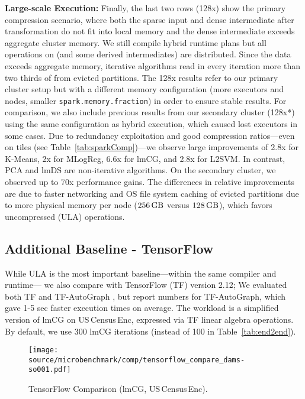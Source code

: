 \textbf{Large-scale Execution:}
Finally, the last two rows (128x) show the primary compression scenario, where both
the sparse input and dense intermediate after transformation do not fit into local memory
and the dense intermediate exceeds aggregate cluster memory.
We still compile hybrid runtime plans but all operations on  (and some derived intermediates) are distributed.
Since the data exceeds aggregate memory, iterative algorithms read in every iteration more than two thirds of  from evicted partitions.
The 128x results refer to our primary cluster setup but with a different memory configuration (more executors and nodes, smaller \texttt{spark.memory.fraction}) in order to ensure stable results. For comparison, we also include previous results from our secondary cluster (128x*) using the same configuration as hybrid execution, which caused lost executors in some cases. Due to redundancy exploitation and good compression ratios---even on tiles (see Table~\ref{tab:sparkComp})---we observe large improvements of 2.8x for K-Means, 2x for MLogReg, 6.6x for lmCG, and 2.8x for L2SVM. In contrast, PCA and lmDS are non-iterative algorithms. On the secondary cluster, we observed up to 70x performance gains. The differences in relative improvements are due to faster networking and OS file system caching of evicted partitions due to more physical memory per node ($256\gb$ versus $128\gb$), which favors uncompressed (ULA) operations. 
 

\subsection{Additional Baseline - TensorFlow}

While ULA is the most important
baseline---within the same compiler and runtime--- we
also compare with TensorFlow (TF) version 2.12;
We evaluated both TF and TF-AutoGraph \cite{abs-1810-08061}, but report numbers for TF-AutoGraph, which gave 1-5 sec faster execution times on average.
The workload is a simplified version of lmCG on US\,Census\,Enc, expressed via TF linear algebra operations.
By default, we use 300 lmCG iterations (instead of 100 in Table~\ref{tab:end2end}).

\begin{figure}[!t]
	\centering
	\texttt{[image: \\source/microbenchmark/comp/tensorflow\_compare\_dams-so001.pdf]}
  \vspace{-0.25cm}
	\caption{\label{exp:tensorflow} TensorFlow Comparison {\normalfont(lmCG, US\,Census\,Enc)}.}
\end{figure}


